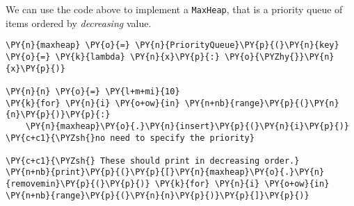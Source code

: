 We can use the code above to implement a \texttt{MaxHeap}, that is a priority queue of items ordered by \emph{decreasing} value.

\begin{Verbatim}[commandchars=\\\{\}]
\PY{n}{maxheap} \PY{o}{=} \PY{n}{PriorityQueue}\PY{p}{(}\PY{n}{key} \PY{o}{=} \PY{k}{lambda} \PY{n}{x}\PY{p}{:} \PY{o}{\PYZhy{}}\PY{n}{x}\PY{p}{)}

\PY{n}{n} \PY{o}{=} \PY{l+m+mi}{10}
\PY{k}{for} \PY{n}{i} \PY{o+ow}{in} \PY{n+nb}{range}\PY{p}{(}\PY{n}{n}\PY{p}{)}\PY{p}{:}
    \PY{n}{maxheap}\PY{o}{.}\PY{n}{insert}\PY{p}{(}\PY{n}{i}\PY{p}{)} \PY{c+c1}{\PYZsh{}no need to specify the priority}

\PY{c+c1}{\PYZsh{} These should print in decreasing order.}
\PY{n+nb}{print}\PY{p}{(}\PY{p}{[}\PY{n}{maxheap}\PY{o}{.}\PY{n}{removemin}\PY{p}{(}\PY{p}{)} \PY{k}{for} \PY{n}{i} \PY{o+ow}{in} \PY{n+nb}{range}\PY{p}{(}\PY{n}{n}\PY{p}{)}\PY{p}{]}\PY{p}{)}
\end{Verbatim}
